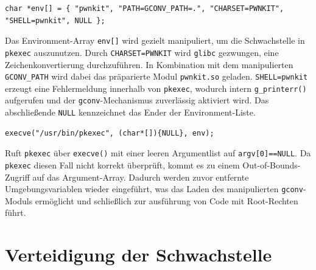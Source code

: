\documentclass[oneside,11pt,a4paper,article,german]{memoir}
\begin{document}
\begin{lstlisting}[caption={Manipuliertes Environment}]
    char *env[] = { "pwnkit", "PATH=GCONV_PATH=.", "CHARSET=PWNKIT", "SHELL=pwnkit", NULL };
\end{lstlisting}

\par
Das Environment-Array \texttt{env[]} wird gezielt manipuliert, um die Schwachstelle in \texttt{pkexec} auszunutzen.
Durch \texttt{CHARSET=PWNKIT} wird \texttt{glibc} gezwungen, eine Zeichenkonvertierung durchzuführen.
In Kombination mit dem manipulierten \texttt{GCONV\_PATH} wird dabei das präparierte Modul \texttt{pwnkit.so} geladen.
\texttt{SHELL=pwnkit} erzeugt eine Fehlermeldung innerhalb von \texttt{pkexec}, wodurch intern \texttt{g\_printerr()} aufgerufen und der \texttt{gconv}-Mechanismus
zuverlässig aktiviert wird.
Das abschließende \texttt{NULL} kennzeichnet das Ender der Environment-Liste.

\par

\begin{lstlisting}[caption={6 Ausführung von \texttt{pkexec}}]
    execve("/usr/bin/pkexec", (char*[]){NULL}, env);
\end{lstlisting}

\par
Ruft \texttt{pkexec} über \texttt{execve()} mit einer leeren Argumentlist auf \texttt{argv[0]==NULL}.
Da \texttt{pkexec} diesen Fall nicht korrekt überprüft, kommt es zu einem Out-of-Bounds-Zugriff auf das Argument-Array.
Dadurch werden zuvor entfernte Umgebungsvariablen wieder eingeführt, was das Laden des manipulierten \texttt{gconv}-Moduls ermöglicht und
schließlich zur ausführung von Code mit Root-Rechten führt.

\section{Verteidigung der Schwachstelle}
\label{sec:org5d09783}
\end{document}
